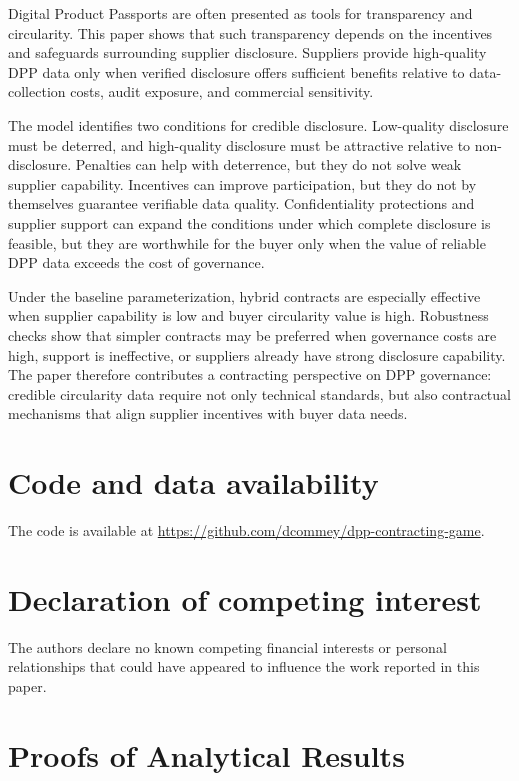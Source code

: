 \documentclass[final,5p,times,authoryear]{elsarticle}
\begin{document}
Digital Product Passports are often presented as tools for transparency and circularity. This paper shows that such transparency depends on the incentives and safeguards surrounding supplier disclosure. Suppliers provide high-quality DPP data only when verified disclosure offers sufficient benefits relative to data-collection costs, audit exposure, and commercial sensitivity.

The model identifies two conditions for credible disclosure. Low-quality disclosure must be deterred, and high-quality disclosure must be attractive relative to non-disclosure. Penalties can help with deterrence, but they do not solve weak supplier capability. Incentives can improve participation, but they do not by themselves guarantee verifiable data quality. Confidentiality protections and supplier support can expand the conditions under which complete disclosure is feasible, but they are worthwhile for the buyer only when the value of reliable DPP data exceeds the cost of governance.

Under the baseline parameterization, hybrid contracts are especially effective when supplier capability is low and buyer circularity value is high. Robustness checks show that simpler contracts may be preferred when governance costs are high, support is ineffective, or suppliers already have strong disclosure capability. The paper therefore contributes a contracting perspective on DPP governance: credible circularity data require not only technical standards, but also contractual mechanisms that align supplier incentives with buyer data needs.

\section*{Code and data availability}

The code is available at \href{https://github.com/dcommey/dpp-contracting-game}{https://github.com/dcommey/dpp-contracting-game}.

\section*{Declaration of competing interest}

The authors declare no known competing financial interests or personal relationships that could have appeared to influence the work reported in this paper.

\appendix
\section{Proofs of Analytical Results}
\label{app:proofs}
\end{document}
